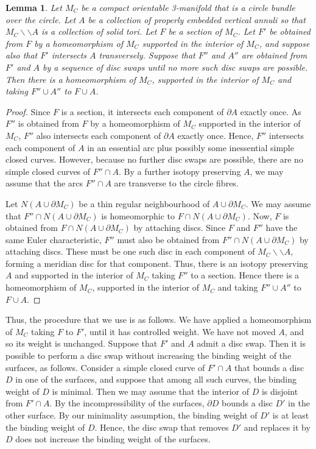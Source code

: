 \documentclass[oneside]{amsart}
\numberwithin{equation}{section}
\theoremstyle{plain}
\newtheorem{lemma}[equation]{Lemma}
\theoremstyle{definition}
\newcommand{\cut}{\backslash\backslash}
\begin{document}
\begin{lemma}
\label{Lem:SectionAnnuliHomeo}
Let $M_C$ be a compact orientable 3-manifold that is a circle bundle over the circle.
Let $A$ be a collection of properly embedded vertical annuli so that $M_C \cut A$ is a
collection of solid tori. Let $F$ be a section of $M_C$. Let $F'$ be obtained from $F$
by a homeomorphism of $M_C$ supported in the interior of $M_C$, and suppose also that $F'$ intersects
$A$ transversely. Suppose that $F''$ and $A''$ are obtained from $F'$ and $A$ by a sequence of disc
swaps until no more such disc swaps are
possible. Then there is a homeomorphism of $M_C$, supported in the interior of $M_C$ and taking $F'' \cup A''$ 
to $F \cup A$.
\end{lemma}

\begin{proof}
Since $F$ is a section, it intersects each component of $\partial A$ exactly once.
As $F''$ is obtained from $F$ by a homeomorphism of $M_C$ supported in the interior of $M_C$,
$F''$ also intersects each component of $\partial A$ exactly once.
Hence, $F''$ intersects each component of $A$ in an essential arc plus possibly 
some inessential simple closed curves. However, because no further
disc swaps are possible, there are no simple closed curves of $F'' \cap A$.
By a further isotopy preserving $A$, we may assume that 
the arcs $F'' \cap A$ are transverse to the circle fibres.  

Let $N(A \cup \partial M_C)$ be a thin regular neighbourhood of $A \cup \partial M_C$. 
We may assume that $F'' \cap N(A \cup \partial M_C)$ is homeomorphic to $F \cap N(A \cup \partial M_C)$.
Now, $F$ is obtained from $F \cap N(A \cup \partial M_C)$ by attaching discs. Since $F$ and $F''$
have the same Euler characteristic, $F''$ must also be obtained from $F'' \cap N(A \cup \partial M_C)$
by attaching discs. These must be one such disc in each component of $M_C \cut A$, forming
a meridian disc for that component. Thus, there is an isotopy preserving $A$ and supported in 
the interior of $M_C$ taking $F''$ to a section. Hence there is a homeomorphism of $M_C$, 
supported in the interior of $M_C$ and taking $F'' \cup A''$  to $F \cup A$.
\end{proof}

Thus, the procedure that we use is as follows. We have applied a homeomorphism of $M_C$
taking $F$ to $F'$, until it has
controlled weight. We have not moved $A$, and so its weight is unchanged. Suppose that
$F'$ and $A$ admit a disc swap. Then it is possible to perform a disc swap without
increasing the binding weight of the surfaces, as follows. Consider a simple
closed curve of $F' \cap A$ that bounds a disc $D$ in one of the surfaces, and
suppose that among all such curves, the binding weight of $D$ is minimal. Then
we may assume that the interior of $D$ is disjoint from $F' \cap A$. By the incompressibility
of the surfaces, $\partial D$ bounds a disc $D'$ in the other surface. By our
minimality assumption, the binding weight of $D'$ is at least the binding weight
of $D$. Hence, the disc swap that removes $D'$ and replaces it by $D$ does not
increase the binding weight of the surfaces.
\end{document}
